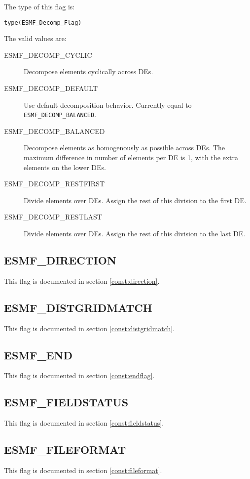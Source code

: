The type of this flag is:

{\tt type(ESMF\_Decomp\_Flag)}

The valid values are:
\begin{description}
\item [ESMF\_DECOMP\_CYCLIC]
      Decompose elements cyclically across DEs.
\item [ESMF\_DECOMP\_DEFAULT]
      Use default decomposition behavior. Currently equal to 
      {\tt ESMF\_DECOMP\_BALANCED}.
\item [ESMF\_DECOMP\_BALANCED]
      Decompose elements as homogenously as possible across DEs. The maximum 
      difference in number of elements per DE is 1, with the extra elements on
      the lower DEs.
\item [ESMF\_DECOMP\_RESTFIRST]
      Divide elements over DEs. Assign the rest of this division to the first
      DE.
\item [ESMF\_DECOMP\_RESTLAST]
      Divide elements over DEs. Assign the rest of this division to the last DE.
\end{description}

\subsection{ESMF\_DIRECTION}
This flag is documented in section \ref{const:direction}.

\subsection{ESMF\_DISTGRIDMATCH}
This flag is documented in section \ref{const:distgridmatch}.

\subsection{ESMF\_END}

This flag is documented in section \ref{const:endflag}.

\subsection{ESMF\_FIELDSTATUS}
This flag is documented in section \ref{const:fieldstatus}.

\subsection{ESMF\_FILEFORMAT}
This flag is documented in section \ref{const:fileformat}.

